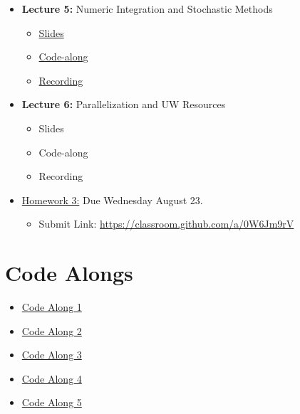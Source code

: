 \documentclass[
]{book}
\providecommand{\tightlist}{%
  \setlength{\itemsep}{0pt}\setlength{\parskip}{0pt}}
\begin{document}
\begin{itemize}
\tightlist
\item
  \textbf{Lecture 5:} Numeric Integration and Stochastic Methods

  \begin{itemize}
  \tightlist
  \item
    \href{https://kevinghunt.github.io/ComputationCamp/lectures/Lecture5.html}{Slides}
  \item
    \href{https://kevinghunt.github.io/ComputationCamp/codealongs/CodeAlong5.jl}{Code-along}
  \item
    \href{https://uwmadison.zoom.us/rec/share/Rc-Mno_HDmfyakQGBhzxhbOjYIxXkX8ka4vkksy2p5Y-lxDZCJ2x08U8ja6LzMEV.54CVfkLcQhOLID_m}{Recording}
  \end{itemize}
\item
  \textbf{Lecture 6:} Parallelization and UW Resources

  \begin{itemize}
  \tightlist
  \item
    Slides
  \item
    Code-along
  \item
    Recording
  \end{itemize}
\item
  \href{https://kevinghunt.github.io/ComputationCamp/homeworks/homework3.html}{Homework 3:} Due Wednesday August 23.

  \begin{itemize}
  \tightlist
  \item
    Submit Link: \url{https://classroom.github.com/a/0W6Jm9rV}
  \end{itemize}
\end{itemize}

\hypertarget{code-alongs}{%
\chapter{Code Alongs}\label{code-alongs}}

\begin{itemize}
\tightlist
\item
  \href{https://kevinghunt.github.io/ComputationCamp/codealongs/CodeAlong1.jl}{Code Along 1}
\item
  \href{https://kevinghunt.github.io/ComputationCamp/codealongs/CodeAlong2.jl}{Code Along 2}
\item
  \href{https://kevinghunt.github.io/ComputationCamp/codealongs/CodeAlong3.jl}{Code Along 3}
\item
  \href{https://kevinghunt.github.io/ComputationCamp/codealongs/CodeAlong4.jl}{Code Along 4}
\item
  \href{https://kevinghunt.github.io/ComputationCamp/codealongs/CodeAlong5.jl}{Code Along 5}
\end{itemize}

  
\end{document}
